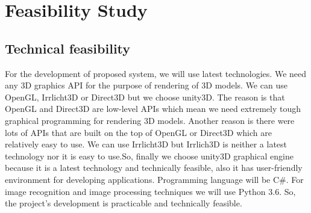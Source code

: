 \documentclass{article}
\begin{document}
\section{Feasibility Study}


\subsection{Technical feasibility}
For the development of proposed system, we will use latest technologies. We need any 3D graphics API for the purpose of rendering of 3D models. We can use OpenGL, Irrlicht3D or Direct3D but we choose unity3D. The reason is that OpenGL and Direct3D are low-level APIs which mean we need extremely tough graphical programming for rendering 3D models. Another reason is there were lots of APIs that are built on the top of OpenGL or Direct3D which are relatively easy to use. We can use Irrlicht3D\cite{Irrlicht} but Irrlich3D is neither a latest technology nor it is easy to use.So, finally we choose unity3D graphical engine because it is a latest technology and technically feasible, also it has user-friendly environment for developing applications. Programming language will be C\#. For image recognition and image processing techniques we will use Python 3.6. So, the project’s development is practicable and technically feasible.\cite{TechFeas}\\
\end{document}
